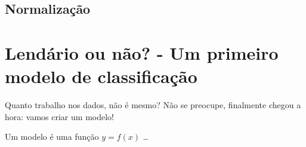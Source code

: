 \documentclass[]{book}
\begin{document}
\hypertarget{normalizauxe7uxe3o}{%
\section{Normalização}\label{normalizauxe7uxe3o}}

\hypertarget{lenduxe1rio-ou-nuxe3o---um-primeiro-modelo-de-classificauxe7uxe3o}{%
\chapter{Lendário ou não? - Um primeiro modelo de classificação}\label{lenduxe1rio-ou-nuxe3o---um-primeiro-modelo-de-classificauxe7uxe3o}}

Quanto trabalho nos dados, não é mesmo? Não se preocupe, finalmente chegou a hora: vamos criar um modelo!

Um modelo é uma função \(y = f(x)\) \ldots{}


\end{document}
